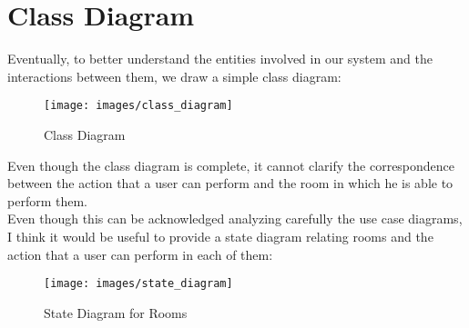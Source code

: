 	\section{Class Diagram}
	Eventually, to better understand the entities involved in our system and the interactions between them, we draw a simple class diagram:
	\begin{figure}[H]
		\centering
		\texttt{[image: images/class\_diagram]}
		\caption{Class Diagram}
		\label{fig:class_diagram}
	\end{figure}
\newpage
	Even though the class diagram is complete, it cannot clarify the correspondence between the action that a user can perform and the room in which he is able to perform them.\\
	Even though this can be acknowledged analyzing carefully the use case diagrams, I think it would be useful to provide a state diagram relating rooms and the action that a user can perform in each of them:
	\begin{figure}[H]
		\centering
		\texttt{[image: images/state\_diagram]}
		\caption{State Diagram for Rooms}
		\label{fig:state_diagram}
	\end{figure}